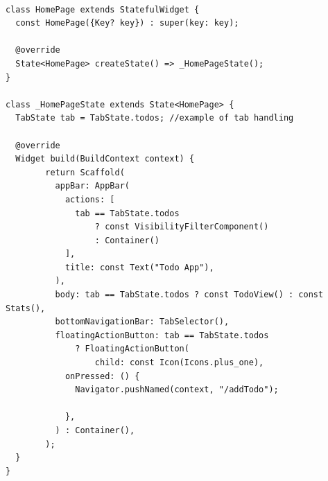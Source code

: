 	\mbox{}
	\begin{code}
	 \mbox{}
			\label{code:2.12}

	\begin{verbatim}

class HomePage extends StatefulWidget {
  const HomePage({Key? key}) : super(key: key);

  @override
  State<HomePage> createState() => _HomePageState();
}

class _HomePageState extends State<HomePage> {
  TabState tab = TabState.todos; //example of tab handling

  @override
  Widget build(BuildContext context) {
        return Scaffold(
          appBar: AppBar(
            actions: [
              tab == TabState.todos
                  ? const VisibilityFilterComponent()
                  : Container()
            ],
            title: const Text("Todo App"),
          ),
          body: tab == TabState.todos ? const TodoView() : const Stats(),
          bottomNavigationBar: TabSelector(),
          floatingActionButton: tab == TabState.todos
              ? FloatingActionButton(
                  child: const Icon(Icons.plus_one),
            onPressed: () {
              Navigator.pushNamed(context, "/addTodo");

            },
          ) : Container(),
        );
  }
}
	\end{verbatim}
	\end{code}

